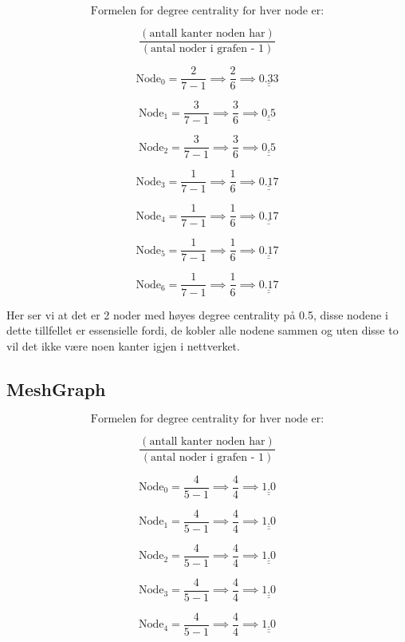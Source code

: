 \documentclass[11pt]{article}
\begin{document}
\[\text{Formelen for degree centrality for hver node er:}\]

\[\frac{(\text{antall kanter noden har})}{(\text{antal noder i grafen - 1})}\]

\[\text{Node}_0 = \frac{2}{7 - 1} \implies \frac{2}{6} \implies \underline{\underline{ 0.33}}\]

\[\text{Node}_1 = \frac{3}{7 - 1} \implies \frac{3}{6} \implies \underline{\underline{ 0.5}}\]

\[\text{Node}_2 = \frac{3}{7 - 1} \implies \frac{3}{6} \implies \underline{\underline{ 0.5}}\]

\[\text{Node}_3 = \frac{1}{7 - 1} \implies \frac{1}{6} \implies \underline{\underline{ 0.17}}\]

\[\text{Node}_4 = \frac{1}{7 - 1} \implies \frac{1}{6} \implies \underline{\underline{ 0.17}}\]

\[\text{Node}_5 = \frac{1}{7 - 1} \implies \frac{1}{6} \implies \underline{\underline{ 0.17}}\]

\[\text{Node}_6 = \frac{1}{7 - 1} \implies \frac{1}{6} \implies \underline{\underline{ 0.17}}\]

Her ser vi at det er 2 noder med høyes degree centrality på 0.5, disse
nodene i dette tillfellet er essensielle fordi, de kobler alle nodene
sammen og uten disse to vil det ikke være noen kanter igjen i
nettverket.

    \hypertarget{meshgraph}{%
\subsection*{MeshGraph}\label{meshgraph}}

\[\text{Formelen for degree centrality for hver node er:}\]

\[\frac{(\text{antall kanter noden har})}{(\text{antal noder i grafen - 1})}\]

\[\text{Node}_0 = \frac{4}{5 - 1} \implies \frac{4}{4} \implies \underline{\underline{ 1.0}}\]

\[\text{Node}_1 = \frac{4}{5 - 1} \implies \frac{4}{4} \implies \underline{\underline{ 1.0}}\]

\[\text{Node}_2 = \frac{4}{5 - 1} \implies \frac{4}{4} \implies \underline{\underline{ 1.0}}\]

\[\text{Node}_3 = \frac{4}{5 - 1} \implies \frac{4}{4} \implies \underline{\underline{ 1.0}}\]

\[\text{Node}_4 = \frac{4}{5 - 1} \implies \frac{4}{4} \implies \underline{\underline{ 1.0}}\]
\end{document}
